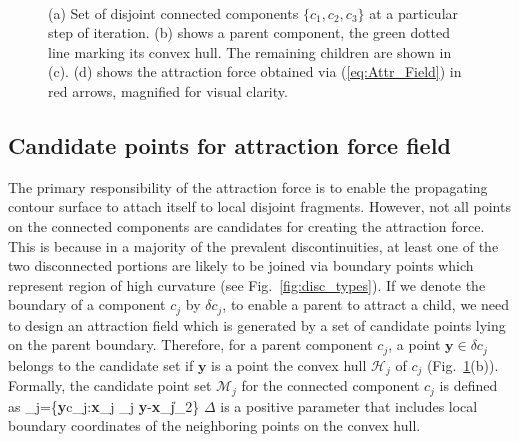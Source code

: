 \begin{figure}[t]
\centering
{}\hspace{-0.2cm}
\hspace{-0.2cm}
\hspace{-0.2cm}
\\
\centering
{}
\caption[Graphic illustration of local attraction force field]{(a) Set of disjoint connected components $\{c_1,c_2,c_3\}$ at a particular step of iteration. (b) shows a parent component, the green dotted line marking its convex hull. The remaining children are shown in (c). (d) shows the attraction force obtained via (\ref{eq:Attr_Field}) in red arrows, magnified for visual clarity.}
\label{fig:attr_force}
\vspace{-0.2in}
\end{figure}

\subsection{Candidate points for attraction force field}
The primary responsibility of the attraction force is to enable the propagating contour surface to attach itself to local disjoint fragments. However, not all points on the connected components are candidates for creating the attraction force. This is because in a majority of the prevalent discontinuities, at least one of the two disconnected portions are likely to be joined via boundary points which represent region of high curvature (see Fig.~\ref{fig:disc_types}). 
If we denote the boundary of a component $c_j$ by $\delta c_j$, to enable a parent to attract a child, we need to design an attraction field which is generated by a set of candidate points lying on the parent boundary. 
Therefore, for a parent component $c_j$, a point $\textbf{y}\in \delta c_j$ belongs to the candidate set if $\textbf{y}$ is a point the convex hull \cite{convex_hull_graham} $\mathcal{H}_j$  of $c_j$ (Fig.~\ref{fig:attr_force}(b)). Formally, the candidate point set $\mathcal{M}_j$ for the connected component $c_j$ is defined as
\bea
{}_j=\{\textbf{y}\in \delta c_j:\exists \:\textbf{x}_j \in {}_j \;\; \; \|\textbf{y}-\textbf{x}_j\|_2\leq \Delta\}
\eea
$\Delta$ is a positive parameter that includes local boundary coordinates of the neighboring points on the convex hull. 

